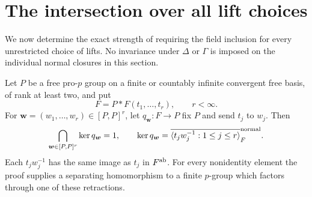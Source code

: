 
\section{The intersection over all lift choices}
\label{sec:all-lift-intersection}

We now determine the exact strength of requiring the field inclusion
for every unrestricted choice of lifts.  No invariance under
$\Delta$ or $\Gamma$ is imposed on the individual normal closures
in this section.

\begin{theorem}\label{thm:all-lift-intersection}
Let $P$ be a free pro-$p$ group on a finite or countably infinite
convergent free basis, of rank at least two, and put
\[
 F=P*F(t_1,\ldots,t_r),\qquad r<\infty.
\]
For $\boldsymbol w=(w_1,\ldots,w_r)\in[P,P]^r$, let
$q_{\boldsymbol w}:F\to P$ fix $P$ and send $t_j$ to $w_j$.
Then
\[
 \bigcap_{\boldsymbol w\in[P,P]^r}\ker q_{\boldsymbol w}=1,
 \qquad
 \ker q_{\boldsymbol w}
   =\overline{\langle t_jw_j^{-1}:1\leq j\leq r\rangle}^{\rm normal}_F.
\]
Each $t_jw_j^{-1}$ has the same image as $t_j$ in $F^{\rm ab}$.
For every nonidentity element the proof supplies a separating
homomorphism to a finite $p$-group which factors through one of
these retractions.
\end{theorem}

